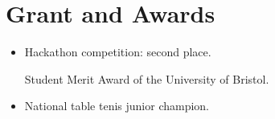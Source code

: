 \section{Grant and Awards}
\begin{mySectionContents}
\begin{itemize}
    \setlength\itemsep{2em} %
    \item {}
    \begin{itemize}
         Hackathon competition: second place.

         Student Merit Award of the University of Bristol.

    \end{itemize}
    \item {}
    \begin{itemize}
         National table tenis junior champion.
    \end{itemize}
\end{itemize}
\end{mySectionContents}
